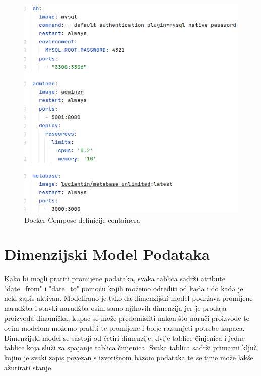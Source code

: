 \documentclass[12pt, oneside]{book}
\begin{document}
\begin{figure}[h]
\includegraphics[width=12cm]{images/i01_Dockerfile.png}
\centering
\caption{Docker Compose definicije containera}
\end{figure}

\chapter{Dimenzijski Model Podataka}
\label{Cdim}
Kako bi mogli pratiti promijene podataka, svaka tablica sadrži atribute "date\_from" i "date\_to" pomoću kojih možemo odrediti od kada i do kada je neki zapis aktivan. Modelirano je tako da dimenzijski model podržava promijene narudžba i stavki narudžba osim samo njihovih dimenzija jer je prodaja proizvoda dinamička, kupac se može predomisliti nakon što naruči proizvode te ovim modelom možemo pratiti te promijene i bolje razumjeti potrebe kupaca. Dimenzijski model se sastoji od četiri dimenzije, dvije tablice činjenica i jedne tablice koja služi za spajanje tablica činjenica. Svaka tablica sadrži primarni ključ kojim je svaki zapis povezan s izvorišnom bazom podataka te se time može lakše ažurirati stanje.
\end{document}
